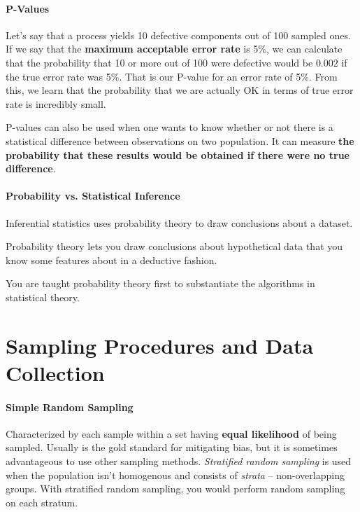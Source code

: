 \documentclass[a4paper,12pt]{report}
\begin{document}
\paragraph{P-Values} 

Let's say that a process yields 10 defective components out of 100 sampled ones. If we say that the \textbf{maximum acceptable error rate} is 5\%, we can calculate that the probability that 10 or more out of 100 were defective would be $0.002$ if the true error rate was 5\%. That is our P-value for an error rate of 5\%. From this, we learn that the probability that we are actually OK in terms of true error rate is incredibly small.


P-values can also be used when one wants to know whether or not there is a statistical difference between observations on two population. It can measure \textbf{the probability that these results would be obtained if there were no true difference}. 

\paragraph{Probability vs. Statistical Inference} 

Inferential statistics uses probability theory to draw conclusions about a dataset. 

Probability theory lets you draw conclusions about hypothetical data that you know some features about in a deductive fashion.

You are taught probability theory first to substantiate the algorithms in statistical theory.



\section{Sampling Procedures and Data Collection}

\paragraph{Simple Random Sampling}

Characterized by each sample within a set having \textbf{equal likelihood} of being sampled. Usually is the gold standard for mitigating bias, but it is sometimes advantageous to use other sampling methods. \textit{Stratified random sampling} is used when the population isn't homogenous and consists of \textit{strata} -- non-overlapping groups. With stratified random sampling, you would perform random sampling on each stratum. 
\end{document}
